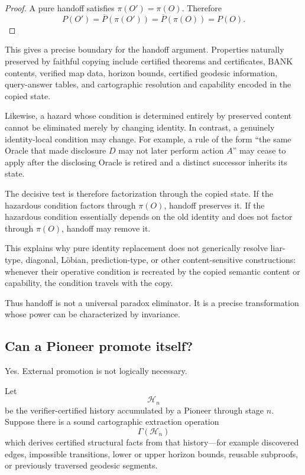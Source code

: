 \documentclass[11pt]{article}
\newcommand{\BANK}{\mathrm{BANK}}
\begin{document}
\begin{proof}
A pure handoff satisfies $\pi(O')=\pi(O)$. Therefore
\[
P(O')=\overline P(\pi(O'))=\overline P(\pi(O))=P(O).
\]
\end{proof}

This gives a precise boundary for the handoff argument. Properties naturally preserved by faithful copying include certified theorems and certificates, $\BANK$ contents, verified map data, horizon bounds, certified geodesic information, query-answer tables, and cartographic resolution and capability encoded in the copied state.

Likewise, a hazard whose condition is determined entirely by preserved content cannot be eliminated merely by changing identity. In contrast, a genuinely identity-local condition may change. For example, a rule of the form ``the same Oracle that made disclosure $D$ may not later perform action $A$'' may cease to apply after the disclosing Oracle is retired and a distinct successor inherits its state.

The decisive test is therefore factorization through the copied state. If the hazardous condition factors through $\pi(O)$, handoff preserves it. If the hazardous condition essentially depends on the old identity and does not factor through $\pi(O)$, handoff may remove it.

This explains why pure identity replacement does not generically resolve liar-type, diagonal, L\"obian, prediction-type, or other content-sensitive constructions: whenever their operative condition is recreated by the copied semantic content or capability, the condition travels with the copy.

Thus handoff is not a universal paradox eliminator. It is a precise transformation whose power can be characterized by invariance.

\subsection{Can a Pioneer promote itself?}
Yes. External promotion is not logically necessary.

Let
\[
\mathcal H_n
\]
be the verifier-certified history accumulated by a Pioneer through stage $n$. Suppose there is a sound cartographic extraction operation
\[
\Gamma(\mathcal H_n)
\]
which derives certified structural facts from that history---for example discovered edges, impossible transitions, lower or upper horizon bounds, reusable subproofs, or previously traversed geodesic segments.
\end{document}

